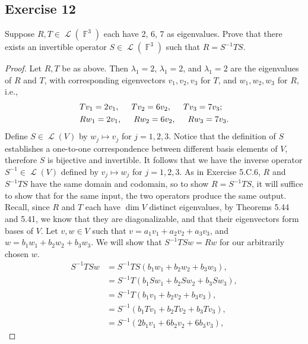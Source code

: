 \documentclass[letterpaper, 12pt]{amsart}
\DeclareMathOperator{\F}{\mathbb{F}}				%
\DeclareMathOperator{\Ell}{\mathscr{L}}				%
\theoremstyle{definition}  							%
\begin{document}
		\subsection*{Exercise 12}
		Suppose $R,T \in \Ell(\F^{3})$ each have 2, 6, 7 as eigenvalues. 
		Prove that there exists an invertible operator $S \in \Ell(\F^{3})$ such that $R = S^{-1}TS$.
		\vspace*{3mm}

		\begin{proof}
		Let $R,T$ be as above.
		Then $\lambda_{1} = 2$, $\lambda_{1} = 2$, and $\lambda_{1} = 2$ are the eigenvalues of $R$ and $T$, with corresponding eigenvectors $v_{1}, v_{2}, v_{3}$ for $T$, and $w_{1}, w_{2}, w_{3}$ for $R$, i.e.,
			\begin{align*}
				&Tv_{1} = 2v_{1}, \hspace{5mm} Tv_{2} = 6v_{2}, \hspace{5mm} Tv_{3} = 7v_{3}; \\
				&Rw_{1} = 2v_{1}, \hspace{5mm} Rw_{2} = 6v_{2}, \hspace{5mm} Rw_{3} = 7v_{3}.
			\end{align*}
		Define $S \in \Ell(V)$ by $w_{j} \mapsto v_{j}$ for $j = 1,2,3$.
		Notice that the definition of $S$ establishes a one-to-one correspondence between different basis elements of $V$, therefore $S$ is bijective and invertible.
		It follows that we have the inverse operator $S^{-1} \in \Ell(V)$ defined by $v_{j} \mapsto w_{j}$ for $j = 1,2,3$.
		As in Exercise 5.C.6, $R$ and $S^{-1}TS$ have the same domain and codomain, so to show $R = S^{-1}TS$, it will suffice to show that for the same input, the two operators produce the same output.
		Recall, since $R$ and $T$ each have $\dim V$ distinct eigenvalues, by Theorems 5.44 and 5.41, we know that they are diagonalizable, and that their eigenvectors form bases of $V$.
		Let $v,w \in V$ such that $v = a_{1}v_{1} + a_{2}v_{2} + a_{3}v_{3}$, and $w = b_{1}w_{1} + b_{2}w_{2} + b_{3}w_{3}$.
		We will show that $S^{-1}TSw = Rw$ for our arbitrarily chosen $w$.
			\begin{align*}
				S^{-1}TSw &= S^{-1}TS(b_{1}w_{1} + b_{2}w_{2} + b_{3}w_{3}), \\
				&= S^{-1} T(b_{1}Sw_{1} + b_{2}Sw_{2} + b_{3}Sw_{3}), \\
				&= S^{-1} T(b_{1}v_{1} + b_{2}v_{2} + b_{3}v_{3}), \\
				&= S^{-1}(b_{1}Tv_{1} + b_{2}Tv_{2} + b_{3}Tv_{3}), \\
				&= S^{-1}(2b_{1}v_{1} + 6b_{2}v_{2} + 6b_{3}v_{3}), 

\end{align*}
\end{proof}
\end{document}
